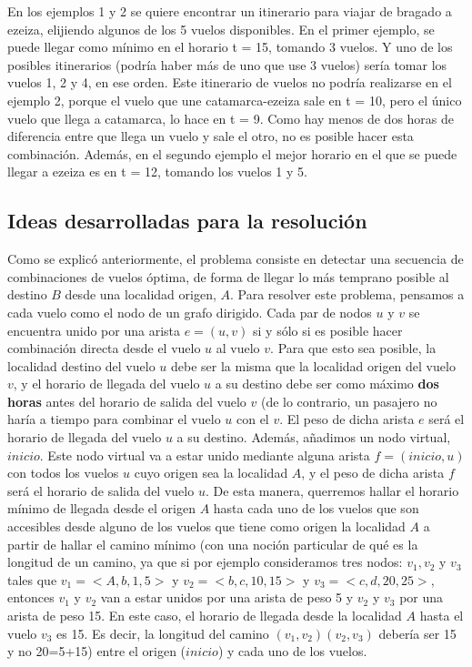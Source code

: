 \documentclass[11pt, a4paper, twoside]{article}
\begin{document}
En los ejemplos 1 y 2 se quiere encontrar un itinerario para viajar de bragado a 
ezeiza, elijiendo algunos de los 5 vuelos disponibles. En el primer ejemplo, se 
puede llegar como mínimo en el horario t = 15, tomando 3 vuelos. Y uno de los
posibles itinerarios (podría haber más de uno que use 3 vuelos) sería tomar los 
vuelos 1, 2 y 4, en ese orden. Este itinerario de vuelos no podría realizarse en
el ejemplo 2, porque el vuelo que une catamarca-ezeiza sale en t = 10, pero el 
único vuelo que llega a catamarca, lo hace en t = 9. Como hay menos de dos horas
de diferencia entre que llega un vuelo y sale el otro, no es posible hacer esta 
combinación. Además, en el segundo ejemplo el mejor horario en el que se puede 
llegar a ezeiza es en t = 12, tomando los vuelos 1 y 5. \\

\subsection{Ideas desarrolladas para la resolución}
Como se explicó anteriormente, el problema consiste en detectar una secuencia de 
combinaciones de vuelos óptima, de forma de llegar lo más temprano posible al destino $B$
desde una localidad origen, $A$.
Para resolver este problema, pensamos a cada vuelo como el nodo de un grafo dirigido.
Cada par de nodos $u$ y $v$ se encuentra unido por una arista $e = (u,v)$ si y sólo si 
es posible hacer combinación directa desde el vuelo $u$ al vuelo $v$. Para que esto sea 
posible, la localidad destino del vuelo $u$ debe ser la misma que la localidad origen
del vuelo $v$, y el horario de llegada del vuelo $u$ a su destino debe ser como máximo 
\textbf{dos horas} antes del horario de salida del vuelo $v$ (de lo contrario, un pasajero
no haría a tiempo para combinar el vuelo $u$ con el $v$. El peso de dicha arista $e$ será
el horario de llegada del vuelo $u$ a su destino.
Además, añadimos un nodo virtual, 
$inicio$. Este nodo virtual va a estar unido mediante alguna arista $f = (inicio,u) $ con
todos los vuelos $u$ cuyo origen sea la localidad $A$, y el peso de dicha arista $f$ será 
el horario de salida del vuelo $u$. De esta manera, querremos hallar el horario mínimo de llegada
desde el origen $A$ hasta cada uno de los vuelos que son accesibles desde alguno de los vuelos 
que tiene como origen la localidad $A$ a partir de hallar el camino mínimo (con una noción 
particular de qué es la longitud de un camino, ya que si por ejemplo consideramos tres nodos: $v_{1},
v_{2}$ y $v_{3}$ tales que $v_{1} = <A,b,1,5>$ y $v_{2} = <b,c,10,15>$ y $v_{3} = <c,d,20,25>$, entonces
$v_{1}$ y $v_{2}$ van a estar unidos por una arista de peso 5 y $v_{2}$ y $v_{3}$ por una arista de
peso 15. En este caso, el horario de llegada desde la localidad $A$ hasta el vuelo $v_{3}$ es 15.
Es decir, la longitud del camino $(v_{1},v_{2})(v_{2},v_{3})$ debería ser 15 y no 20=5+15)
entre el origen ($inicio$) y cada uno de los vuelos.
\end{document}
